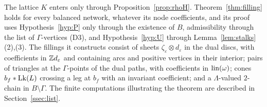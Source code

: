 \begin{remark}\label{rem:whereK}
The lattice $K$ enters only through Proposition~\ref{prop:rhoH}. Theorem~\ref{thm:filling} holds for every balanced network,
whatever its node coefficients, and its proof uses Hypothesis~\ref{hyp:P} only through the existence of $B$, admissibility
through the list of $\Gamma$-vertices (D3), and Hypothesis~\ref{hyp:U} through Lemma~\ref{lem:stalks}(2),(3). The fillings it
constructs consist of sheets $\zeta_\varepsilon\otimes d_\varepsilon$ in the dual discs, with coefficients in $\mathbb Z d_\varepsilon$ and
containing arcs and positive vertices in their interior; pairs of triangles at the $\Gamma$-points of the dual paths, with
coefficients in $\operatorname{lin}(\omega)$; cones $b_f*\operatorname{Lk}(L)$ crossing a leg at $b_f$ with an invariant coefficient; and a
$\Lambda$-valued $2$-chain in $B\setminus\Gamma$. The finite computations illustrating the theorem are described in Section~\ref{ssec:list}.
\end{remark}
